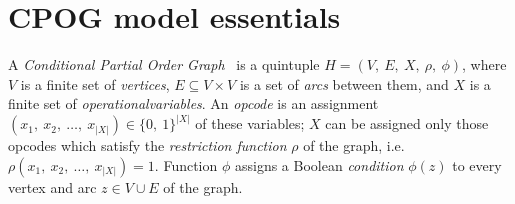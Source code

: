 \section{CPOG model essentials\label{sec:CPOG-model-essentials}}

A \emph{Conditional Partial Order Graph}~\cite{2009_mokhov_phd}\cite{2010_mokhov_ieee}
is a quintuple $H=(V,\ E,\ X,\ \rho,\ \phi)$, where $V$ is a finite
set of \emph{vertices}, $E\subseteq V\times V$ is a set of \emph{arcs}
between them, and $X$ is a finite set of \emph{operational}\emph{variables}. An \emph{opcode} is an assignment $(x_{1},\ x_{2},\ \dots,\ x_{|X|})\in\{0,\ 1\}^{|X|}$
of these variables; $X$ can be assigned only those opcodes which
satisfy the \emph{restriction function} $\rho$
of the graph, i.e. $\rho(x_{1},\ x_{2},\ \dots,\ x_{|X|})=1$. Function
$\phi$ assigns a Boolean \emph{condition} $\phi(z)$ to every vertex
and arc $z\in V\cup E$ of the graph.

